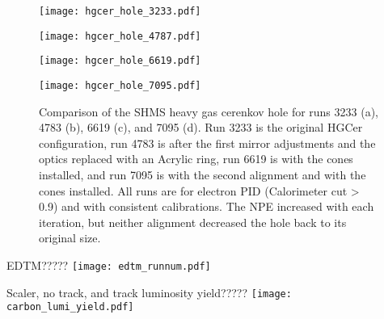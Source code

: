 \begin{figure}
  \centering
  \begin{minipage}[b]{0.48\linewidth}
    \texttt{[image: hgcer\_hole\_3233.pdf]}
  \end{minipage}
  \hfill
  \begin{minipage}[b]{0.48\linewidth}
    \texttt{[image: hgcer\_hole\_4787.pdf]}
  \end{minipage}
  
  \vspace{0.5cm}
  
  \begin{minipage}[b]{0.48\linewidth}
    \texttt{[image: hgcer\_hole\_6619.pdf]}
  \end{minipage}
  \hfill
  \begin{minipage}[b]{0.48\linewidth}
    \texttt{[image: hgcer\_hole\_7095.pdf]}
  \end{minipage}
  
  \caption{Comparison of the SHMS heavy gas cerenkov hole for runs 3233 (a), 4783 (b), 6619 (c), and 7095 (d). Run 3233 is the original HGCer configuration, run 4783 is after the first mirror adjustments and the optics replaced with an Acrylic ring, run 6619 is with the cones installed, and run 7095 is with the second alignment and with the cones installed. All runs are for electron PID (Calorimeter cut > 0.9) and with consistent calibrations. The NPE increased with each iteration, but neither alignment decreased the hole back to its original size.}
  \label{fig:3-3_hgcer_hole}
\end{figure}

\begin{Mfigure}{EDTM?????}
  \centering
  \texttt{[image: edtm\_runnum.pdf]}
  \caption{Total Live Times of all production data.}
  \label{fig:3-4_edtm_runnum}
\end{Mfigure}

\begin{Mfigure}{Scaler, no track, and track luminosity yield?????}
  \centering
  \texttt{[image: carbon\_lumi\_yield.pdf]}
  \caption{The HMS Carbon-12 scaler (left), no track (middle) and track (right) yields for runs taken at $P_{HMS}$=-3.09, $\theta_{HMS}$=35.010.}
  \label{fig:3-4_carbon_lumi_yield}
\end{Mfigure}

